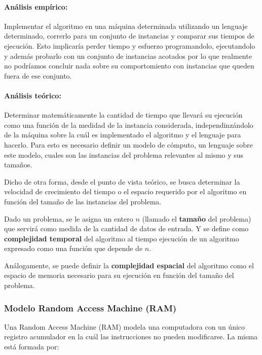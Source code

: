 \paragraph{Análisis empírico:} Implementar el algoritmo en una máquina determinada utilizando un lenguaje determinado, correrlo para un conjunto de instancias y comparar sus tiempos de ejecución. Esto implicaría perder tiempo y esfuerzo programandolo, ejecutandolo y además probarlo con un conjunto de instancias acotados por lo que realmente no podríamos concluir nada sobre su comportomiento con instancias que queden fuera de ese conjunto.

\paragraph{Análisis teórico:} Determinar matemáticamente la cantidad de tiempo que llevará su ejecución como una función de la medidad de la instancia considerada, independinzándolo de la máquina sobre la cuál es implementado el algoritmo y el lenguaje para hacerlo. Para esto es necesario definir un modelo de cómputo, un lenguaje sobre este modelo, cuales son las instancias del problema relevantes al mismo y sus tamaños.

Dicho de otra forma, desde el punto de vista teórico, se busca determinar la velocidad de crecimiento del tiempo o el espacio requerido por el algoritmo en función del tamaño de las instancias del problema.

Dado un problema, se le asigna un entero \(n\) (llamado el \textbf{tamaño} del problema) que servirá como medida de la cantidad de datos de entrada. Y se define como \textbf{complejidad temporal} del algoritmo al tiempo ejecución de un algoritmo expresado como una función que depende de \(n\).

Análogamente, se puede definir la \textbf{complejidad espacial} del algoritmo como el espacio de memoria necesario para su ejecución en función del tamaño del problema.

\subsubsection{Modelo Random Access Machine (RAM)}
Una Random Access Machine (RAM) modela una computadora con un único registro acumulador en la cuál las instrucciones no pueden modificarse. La misma está formada por:

